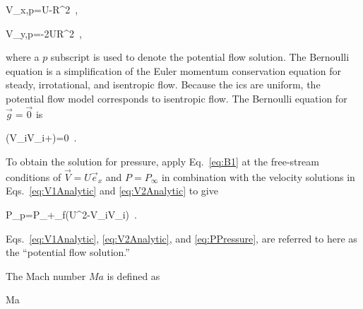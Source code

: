 \beq
\label{eq:V1Analytic}
V_{x,p}=U\left{}-R^2\right\rbrack\ ,
\eeq

\beq
\label{eq:V2Analytic}
V_{y,p}=-2UR^2\ ,
\eeq

\noindent where a \(p\) subscript is used to denote the potential flow solution. The Bernoulli equation is a simplification of the Euler momentum conservation equation for steady, irrotational, and isentropic flow. Because the \glspl{ic} are uniform, the potential flow model corresponds to isentropic flow. The Bernoulli equation for \(\vec{g}=\vec{0}\) is

\beq
\label{eq:B1}
\nabla\left(V_iV_i+\right)=0\ .
\eeq

\noindent To obtain the solution for pressure, apply Eq.\ \eqref{eq:B1} at the free-stream conditions of \(\vec{V}=U\vec{e}_x\) and \(P=P_\infty\) in combination with the velocity solutions in Eqs.\ \eqref{eq:V1Analytic} and \eqref{eq:V2Analytic} to give

\beq
\label{eq:PPressure}
P_p=P_\infty+\rho_f\left(U^2-V_iV_i\right)\ .
\eeq

\noindent Eqs.\ \eqref{eq:V1Analytic}, \eqref{eq:V2Analytic}, and \eqref{eq:PPressure}, are referred to here as the ``potential flow solution.''

The Mach number \(Ma\) is defined as

\beq
\label{eq:MaDef}
Ma\equiv{}\ 
\eeq

